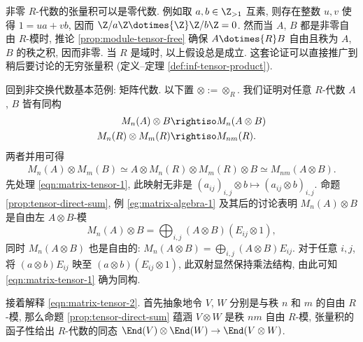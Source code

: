 \begin{remark}\label{rem:algebra-otimes-zero}
	非零 $R$-代数的张量积可以是零代数. 例如取 $a, b \in \Z_{>1}$ 互素, 则存在整数 $u,v$ 使得 $1 = ua+vb$, 因而 $\Z/a\Z \dotimes{\Z} \Z/b\Z = 0$. 然而当 $A$, $B$ 都是非零自由 $R$-模时, 推论 \ref{prop:module-tensor-free} 确保 $A \dotimes{R} B$ 自由且秩为 $A$, $B$ 的秩之积, 因而非零. 当 $R$ 是域时, 以上假设总是成立. 这套论证可以直接推广到稍后要讨论的无穷张量积 (定义--定理 \ref{def:inf-tensor-product}).
\end{remark}

\begin{example}
	回到非交换代数基本范例: 矩阵代数. 以下置 $\otimes := \otimes_R$. 我们证明对任意 $R$-代数 $A$, $B$ 皆有同构
	\begin{align}
		M_n(A) \otimes B & \rightiso M_n(A \otimes B) \label{eqn:matrix-tensor-1} \\
		M_n(R) \otimes M_m(R) & \rightiso M_{nm}(R). \label{eqn:matrix-tensor-2}
	\end{align}
	两者并用可得
	\begin{gather}\label{eqn:matrix-tensor-3}
		M_n(A) \otimes M_m(B) \simeq A \otimes M_n(R) \otimes M_m(R) \otimes B \simeq M_{nm}(A \otimes B).
	\end{gather}
	先处理 \eqref{eqn:matrix-tensor-1}, 此映射无非是 $(a_{ij})_{i,j} \otimes b \mapsto (a_{ij} \otimes b)_{i,j}$. 命题 \ref{prop:tensor-direct-sum}, 例 \ref{eg:matrix-algebra-1} 及其后的讨论表明 $M_n(A) \otimes B$ 是自由左 $A \otimes B$-模
	\[ M_n(A) \otimes B = \bigoplus_{i,j} (A \otimes B) (E_{ij} \otimes 1), \]
	同时 $M_n(A \otimes B)$ 也是自由的: $M_n(A \otimes B) = \bigoplus_{i,j} (A \otimes B) E_{ij}$. 对于任意 $i,j$, 将 $(a \otimes b) E_{ij}$ 映至 $(a \otimes b) (E_{ij} \otimes 1)$, 此双射显然保持乘法结构, 由此可知 \eqref{eqn:matrix-tensor-1} 确为同构.
		
	接着解释 \eqref{eqn:matrix-tensor-2}. 首先抽象地令 $V$, $W$ 分别是与秩 $n$ 和 $m$ 的自由 $R$-模, 那么命题 \ref{prop:tensor-direct-sum} 蕴涵 $V \otimes W$ 是秩 $nm$ 自由 $R$-模, 张量积的函子性给出 $R$-代数的同态 $\End(V) \otimes \End(W) \to \End(V \otimes W)$.
	

\end{example}
